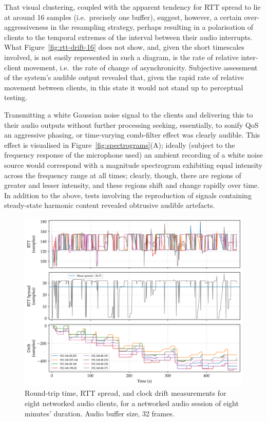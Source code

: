 \documentclass[utf8]{FrontiersinHarvard}
\newcommand{\figref}[1]{Figure~\ref{#1}}
\begin{document}
    That visual clustering, coupled with the apparent tendency for RTT spread to
    lie at around 16 samples (i.e.\ precisely one buffer), suggest, however, a
    certain over-aggressiveness in the resampling strategy, perhaps resulting in a
    polarisation of clients to the temporal extremes of the interval between their
    audio interrupts.
    What \figref{fig:rtt-drift-16} does not show, and, given the short timescales
    involved, is not easily represented in such a diagram, is the rate of relative
    inter-client movement, i.e.\ the rate of change of asynchronicity.
    Subjective assessment of the system's audible output revealed that, given the
    rapid rate of relative movement between clients, in this state it would not
    stand up to perceptual testing.

    Transmitting a white Gaussian noise signal to the clients and delivering this to
    their audio outputs without further processing \textemdash{} seeking,
    essentially, to sonify QoS \textemdash{} an aggressive phasing, or time-varying
    comb-filter effect was clearly audible.
    This effect is visualised in \figref{fig:spectrograms}(A);
    ideally (subject to the frequency response of the microphone used) an ambient
    recording of a white noise source would correspond with a magnitude spectrogram
    exhibiting equal intensity across the frequency range at all times;
    clearly, though, there are regions of greater and lesser intensity, and these
    regions shift and change rapidly over time.
    In addition to the above, tests involving the reproduction of signals
    containing steady-state harmonic content revealed obtrusive audible artefacts.

    \begin{figure}[h]
        \centering
        \includegraphics[width=\textwidth]{figures/rtt_drift_32}
        \caption{
            Round-trip time, RTT spread, and clock drift measurements
            for eight networked audio clients, for a networked audio session of
            eight minutes' duration.
            Audio buffer size, 32 frames.
        }
        \label{fig:rtt-drift-32}
    \end{figure}
\end{document}

